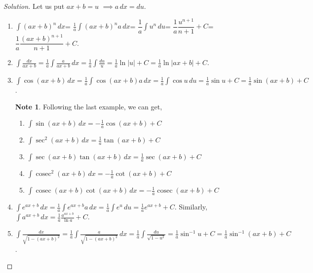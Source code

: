 \documentclass{book}
\DeclareMathOperator{\cosec}{cosec}
\theoremstyle{definition}
\newtheorem*{note}{Note}
\newenvironment{solution}
    {\begin{proof}[Solution]}
    {\end{proof}}
\begin{document}
\begin{solution}
Let us put $ax+b=u$ $\implies a \, dx=du$.
\begin{enumerate}[label=(\roman*)]
\item $\displaystyle\int (ax+b)^n \, dx$= $\frac{1}{a}\displaystyle\int (ax+b)^na \, dx$= $\dfrac{1}{a}\displaystyle\int u^n \, du$= $\dfrac{1}{a}\dfrac{u^{n+1}}{n+1}+C$= $\dfrac{1}{a}\dfrac{(ax+b)^{n+1}}{n+1}+C$.

\item $\displaystyle\int \frac{dx}{ax+b} = \frac{1}{a}\displaystyle\int \frac{a}{ax+b} \, dx=\frac{1}{a}\displaystyle\int \frac{du}{u} = \frac{1}{a}\ln |u|+C = \frac{1}{a}\ln |ax+b|+C$.

\item $\displaystyle\int\cos (ax+b) \, dx = \frac{1}{a}\displaystyle\int\cos (ax+b)a \, dx = \frac{1}{a}\displaystyle\int\cos u \, du =\frac{1}{a}\sin u+C = \frac{1}{a}\sin (ax+b)+C$.



 
\begin{note}
Following the last example, we can get,
\begin{enumerate}
\item  $\displaystyle\int \sin(ax+b) \, dx=-\frac{1}{a}\cos(ax+b)+C$

\item $\displaystyle\int \sec^2(ax+b) \, dx=\frac{1}{a}\tan(ax+b)+C$

\item $\displaystyle\int \sec(ax+b)\tan(ax+b) \, dx=\frac{1}{a}\sec(ax+b)+C$

\item $\displaystyle\int\cosec^2 (ax+b) \, dx=-\frac{1}{a}\cot(ax+b)+C$

\item $\displaystyle\int \cosec (ax+b)\cot(ax+b) \, dx=-\frac{1}{a}\cosec(ax+b)+C$
\end{enumerate}
\end{note}


\item $\displaystyle\int e^{ax+b} \, dx = \frac{1}{a}\displaystyle\int e^{ax+b}a \, dx = \frac{1}{a}\displaystyle\int e^u \, du =\frac{1}{a}e^{ax+b}+C$. Similarly, $\displaystyle\int a^{ax+b} \, dx=\frac{1}{a}\frac{a^{ax+b}}{\ln a}+C$.

\item $\displaystyle\int\frac{dx}{\sqrt{1-(ax+b)^2}} = \frac{1}{a}\displaystyle\int\frac{a}{\sqrt{1-(ax+b)^2}} \, dx = \frac{1}{a}\displaystyle\int\frac{du}{\sqrt{1-u^2}} = \frac{1}{a}\sin^{-1}u+C = \frac{1}{a}\sin^{-1}(ax+b)+C$.


\end{enumerate}
\end{solution}
\end{document}
